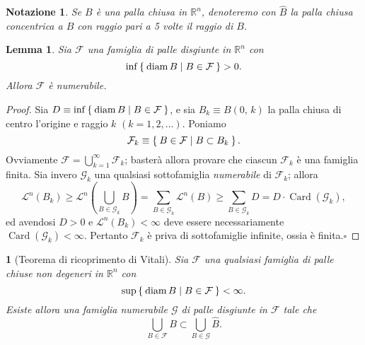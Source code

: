 \documentclass[a4paper,10pt,openright,oneside]{book}
\theoremstyle{theoremstyle}
\newtheorem{lemma}[teorema]{Lemma}
\theoremstyle{theoremstylewoheader}
\newtheorem{teorema2}[teorema]{}
\theoremstyle{theoremstyle}
\newtheorem{notazione}[teorema]{Notazione}
\theoremstyle{proofsecstyle}
\theoremstyle{nonumberplain}
\newtheorem{proof}{Dim.}
\newcommand{\FF}{\ensuremath{\mathcal{F}}}
\newcommand{\GG}{\ensuremath{\mathcal{G}}}
\newcommand{\RR}{\ensuremath{\mathbb{R}}}
\newcommand{\Leb}{\ensuremath{\mathcal{L}}}
\DeclareMathOperator{\diam}{diam}
\DeclareMathOperator{\Card}{Card}
\renewcommand{\qedsymbol}{\ensuremath{\square}}
\newcommand{\qed}{\unskip\nobreak\hfill\nobreak\hspace{.5em}\qedsymbol}
\begin{document}
\begin{notazione}
Se $B$ è una palla chiusa in $\RR^n$, denoteremo con $\hat{B}$ la palla chiusa concentrica a $B$ con raggio pari a 5 volte il raggio di $B$.
\end{notazione}

\begin{lemma}
\label{lem:famiglia_palle_disgiunte}
Sia $\FF$ una famiglia di palle \emph{disgiunte} in $\RR^n$ con
\[
\inf\Set{ \diam B | B \in \FF} > 0.
\]
Allora $\FF$ è numerabile.
\end{lemma}

\begin{proof}
Sia $D \equiv \inf\Set{ \diam B | B \in \FF}$, e sia $B_k \equiv B(0,\, k)$ la palla chiusa di centro l'origine e raggio $k$ $(k = 1, 2, \ldots)$. Poniamo
\[
\FF_k \equiv \Set{ B \in \FF | B \subset B_k }.
\]
Ovviamente $\FF = \bigcup_{k=1}^\infty \FF_k$; basterà allora provare che ciascun $\FF_k$ è una famiglia finita. Sia invero $\GG_k$ una qualsiasi sottofamiglia \emph{numerabile} di $\FF_k$; allora 
\[
\Leb^n(B_k) \ge \Leb^n\left(\bigcup_{B \in \GG_k} B\right) = \sum_{B \in \GG_k} \Leb^n(B) \ge \sum_{B \in \GG_k} D = D \cdot \Card(\GG_k),
\]
ed avendosi $D > 0$ e $\Leb^n(B_k) < \infty$ deve essere necessariamente $\Card(\GG_k) < \infty$. Pertanto $\FF_k$ è priva di sottofamiglie infinite, ossia è finita.\qed
\end{proof}

\begin{teorema2}[Teorema di ricoprimento di Vitali]
\label{thm:ricoprimento_vitali}
Sia $\FF$ una qualsiasi famiglia di palle chiuse non degeneri in $\RR^n$ con
\[
\sup\Set{ \diam B | B \in \FF} < \infty.
\]
Esiste allora una famiglia \emph{numerabile} $\GG$ di palle \emph{disgiunte} in $\FF$ tale che
\[
\bigcup_{B \in \FF} B \subset \bigcup_{B \in \GG} \hat{B}.
\]
\end{teorema2}
\end{document}
